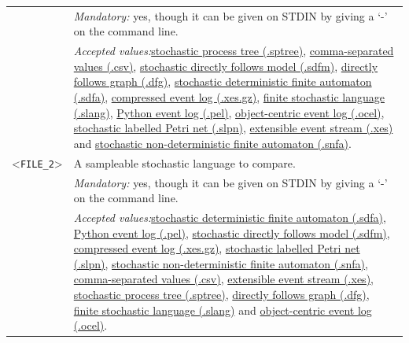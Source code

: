 {\begin{tabularx}{\linewidth}{lX}
&\textit{Mandatory:} \quad yes, though it can be given on STDIN by giving a `-' on the command line.\\
&\textit{Accepted values:}\quad \hyperref[filehandler:stochastic process tree]{stochastic process tree (.sptree)}, \hyperref[filehandler:comma-separated values]{comma-separated values (.csv)}, \hyperref[filehandler:stochastic directly follows model]{stochastic directly follows model (.sdfm)}, \hyperref[filehandler:directly follows graph]{directly follows graph (.dfg)}, \hyperref[filehandler:stochastic deterministic finite automaton]{stochastic deterministic finite automaton (.sdfa)}, \hyperref[filehandler:compressed event log]{compressed event log (.xes.gz)}, \hyperref[filehandler:finite stochastic language]{finite stochastic language (.slang)}, \hyperref[filehandler:Python event log]{Python event log (.pel)}, \hyperref[filehandler:object-centric event log]{object-centric event log (.ocel)}, \hyperref[filehandler:stochastic labelled Petri net]{stochastic labelled Petri net (.slpn)}, \hyperref[filehandler:extensible event stream]{extensible event stream (.xes)} and \hyperref[filehandler:stochastic non-deterministic finite automaton]{stochastic non-deterministic finite automaton (.snfa)}.\\
<\texttt{FILE\_2}>&A sampleable stochastic language to compare.\\
&\textit{Mandatory:} \quad yes, though it can be given on STDIN by giving a `-' on the command line.\\
&\textit{Accepted values:}\quad \hyperref[filehandler:stochastic deterministic finite automaton]{stochastic deterministic finite automaton (.sdfa)}, \hyperref[filehandler:Python event log]{Python event log (.pel)}, \hyperref[filehandler:stochastic directly follows model]{stochastic directly follows model (.sdfm)}, \hyperref[filehandler:compressed event log]{compressed event log (.xes.gz)}, \hyperref[filehandler:stochastic labelled Petri net]{stochastic labelled Petri net (.slpn)}, \hyperref[filehandler:stochastic non-deterministic finite automaton]{stochastic non-deterministic finite automaton (.snfa)}, \hyperref[filehandler:comma-separated values]{comma-separated values (.csv)}, \hyperref[filehandler:extensible event stream]{extensible event stream (.xes)}, \hyperref[filehandler:stochastic process tree]{stochastic process tree (.sptree)}, \hyperref[filehandler:directly follows graph]{directly follows graph (.dfg)}, \hyperref[filehandler:finite stochastic language]{finite stochastic language (.slang)} and \hyperref[filehandler:object-centric event log]{object-centric event log (.ocel)}.\\

\end{tabularx}}
